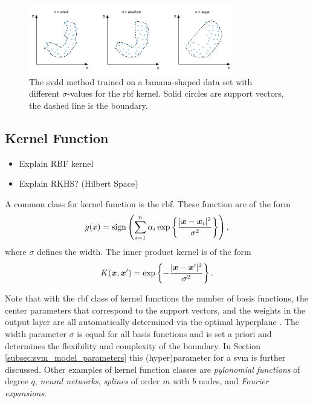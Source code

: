 \begin{figure}
  \centering
    \includegraphics[width=0.8\textwidth,keepaspectratio]{./Figures/chapter3/svdd-parameter-sigma.pdf}
  \caption[\gls{svdd} boundary]{The \gls{svdd} method trained on a banana-shaped data set with different $\sigma$-values for the \gls{rbf} kernel. Solid circles are support vectors, the dashed line is the boundary.}
  \label{fig:svdd-boundary-sigma}
\end{figure}



\subsection{Kernel Function}\label{subsec:kernel_function}

\begin{itemize}
  \item Explain RBF kernel
  \item Explain RKHS? (Hilbert Space)
\end{itemize}

A common class for kernel function is the \acrlong{rbf}.
These function are of the form
\begin{equation}
  g(x) = \operatorname*{sign} \left(  \sum_{i=1}^{n} \alpha_i \operatorname*{exp} \left\{ \frac{|\vectorsym{x} - \vectorsym{x}_i|^2}{\sigma^2} \right\} \right),
\end{equation}
where $\sigma$ defines the width.
The inner product kernel is of the form
\begin{equation}
  K(\vectorsym{x}, \vectorsym{x}') = \operatorname*{exp} \left\{ - \frac{| \vectorsym{x} - \vectorsym{x}'|^2}{\sigma^2} \right\}.
\end{equation}

Note that with the \gls{rbf} class of kernel functions the number of basis functions, the center parameters that correspond to the support vectors, and the weights in the output layer are all automatically determined via the optimal hyperplane \cite{cherkassky2007learning}.
The width parameter $\sigma$ is equal for all basis functions and is set a priori and determines the flexibility and complexity of the boundary.
In Section \ref{subsec:svm_model_parameters} this (hyper)parameter for a \gls{svm} is further discussed.
Other examples of kernel function classes are \emph{pylonomial functions} of degree $q$, \emph{neural networks}, \emph{splines} of order $m$ with $b$ nodes, and \emph{Fourier expansions}.

